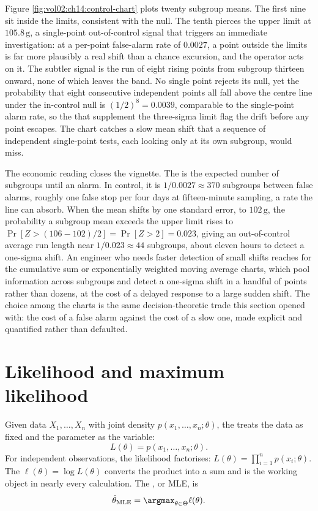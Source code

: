 Figure \ref{fig:vol02:ch14:control-chart} plots twenty subgroup means.
The first nine sit inside the limits, consistent with the null. The
tenth pierces the upper limit at $105.8\,\si{\gram}$, a single-point
out-of-control signal that triggers an immediate investigation: at a
per-point false-alarm rate of $0.0027$, a point outside the limits is
far more plausibly a real shift than a chance excursion, and the
operator acts on it. The subtler signal is the run of eight rising
points from subgroup thirteen onward, none of which leaves the band.
No single point rejects its null, yet the probability that eight
consecutive independent points all fall above the centre line under the
in-control null is $(1/2)^{8} = 0.0039$, comparable to the single-point
alarm rate, so the  that supplement the three-sigma
limit flag the drift before any point escapes. The chart catches a slow
mean shift that a sequence of independent single-point tests, each
looking only at its own subgroup, would miss.

The economic reading closes the vignette. The  is the expected number of subgroups until an alarm. In control,
it is $1/0.0027 \approx 370$ subgroups between false alarms, roughly
one false stop per four days at fifteen-minute sampling, a rate the
line can absorb. When the mean shifts by one standard error, to
$102\,\si{\gram}$, the probability a subgroup mean exceeds the upper
limit rises to $\Pr[Z > (106 - 102)/2] = \Pr[Z > 2] = 0.023$, giving
an out-of-control average run length near $1/0.023 \approx 44$
subgroups, about eleven hours to detect a one-sigma shift. An engineer
who needs faster detection of small shifts reaches for the cumulative
sum or exponentially weighted moving average charts, which pool
information across subgroups and detect a one-sigma shift in a handful
of points rather than dozens, at the cost of a delayed response to a
large sudden shift. The choice among the charts is the same
decision-theoretic trade this section opened with: the cost of a false
alarm against the cost of a slow one, made explicit and quantified
rather than defaulted.



\section{Likelihood and maximum likelihood}

Given data $X_{1}, \ldots, X_{n}$ with joint density $p(x_{1},
\ldots, x_{n}; \theta)$, the  treats
the data as fixed and the parameter as the variable:
\[
L(\theta) = p(x_{1}, \ldots, x_{n}; \theta).
\]
For independent observations, the likelihood factorises:
$L(\theta) = \prod_{i=1}^{n} p(x_{i}; \theta)$. The
 $\ell(\theta) = \log L(\theta)$ converts
the product into a sum and is the working object in nearly every
calculation. The , or MLE, is
\[
\hat{\theta}_{\mathrm{MLE}} = \argmax_{\theta \in \Theta} \ell(\theta).
\]

